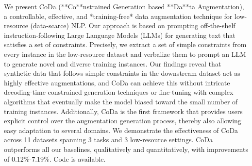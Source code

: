 We present CoDa (**Co**nstrained Generation based **Da**ta Augmentation), a controllable, effective, and *training-free* data augmentation technique for low-resource (data-scarce) NLP. Our approach is based on prompting off-the-shelf instruction-following Large Language Models (LLMs) for generating text that satisfies a set of constraints. Precisely, we extract a set of simple constraints from every instance in the low-resource dataset and verbalize them to prompt an LLM to generate novel and diverse training instances. Our findings reveal that synthetic data that follows simple constraints in the downstream dataset act as highly effective augmentations, and CoDa can achieve this without intricate decoding-time constrained generation techniques or fine-tuning with complex algorithms that eventually make the model biased toward the small number of training instances. Additionally, CoDa is the first framework that provides users explicit control over the augmentation generation process, thereby also allowing easy adaptation to several domains. We demonstrate the effectiveness of CoDa across 11 datasets spanning 3 tasks and 3 low-resource settings. CoDa outperforms all our baselines, qualitatively and quantitatively, with improvements of 0.12\%-7.19\%. Code is available.